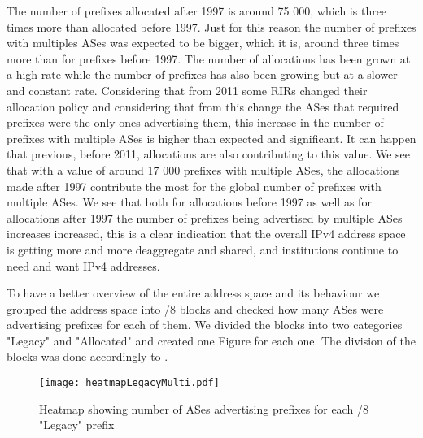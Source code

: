 \documentclass[11pt,a4paper]{scrreprt}
\begin{document}
The number of prefixes allocated after 1997 is around 75 000, which is three times more than allocated before 1997. Just for this reason the number of prefixes with multiples ASes was expected to be bigger, which it is, around three times more than for prefixes before 1997. The number of allocations has been grown at a high rate while the number of prefixes has also been growing but at a slower and constant rate. 
Considering that from 2011 some RIRs changed their allocation policy and considering that from this change the ASes that required prefixes were the only ones advertising them, this increase in the number of prefixes with multiple ASes is higher than expected and significant. It can happen that previous, before 2011, allocations are also contributing to this value. 
We see that with a value of around 17 000 prefixes with multiple ASes, the allocations made after 1997 contribute the most for the global number of prefixes with multiple ASes.  
We see that both for allocations before 1997 as well as for allocations after 1997 the number of prefixes being advertised by multiple ASes increases increased, this is a clear indication that the overall IPv4 address space is getting more and more deaggregate and shared, and institutions continue to need and want IPv4 addresses. 

To have a better overview of the entire address space and its behaviour we grouped the address space into /8 blocks and checked how many ASes were advertising prefixes for each of them. We divided the blocks into two categories "Legacy" and "Allocated" and created one Figure for each one. The division of the blocks was done accordingly to \cite{IANA_Address_Space}.

\begin{figure}[!h]
\centering
\texttt{[image: heatmapLegacyMulti.pdf]}
\caption{Heatmap showing number of ASes advertising prefixes for each /8 "Legacy" prefix}
\label{fig:heatmapLegacyMulti}
\end{figure}
\end{document}
